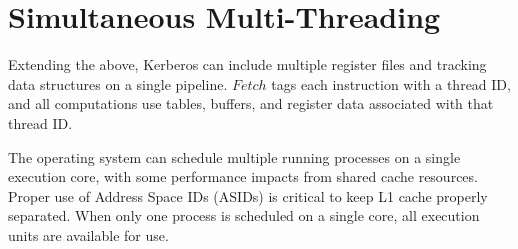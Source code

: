 \section{Simultaneous Multi-Threading}

Extending the above, Kerberos can include multiple register files and tracking
data structures on a single pipeline.  $Fetch$ tags each instruction with a
thread ID, and all computations use tables, buffers, and register data
associated with that thread ID.

The operating system can schedule multiple running processes on a single
execution core, with some performance impacts from shared cache resources.
Proper use of Address Space IDs (ASIDs) is critical to keep L1 cache properly
separated.  When only one process is scheduled on a single core, all execution
units are available for use.
